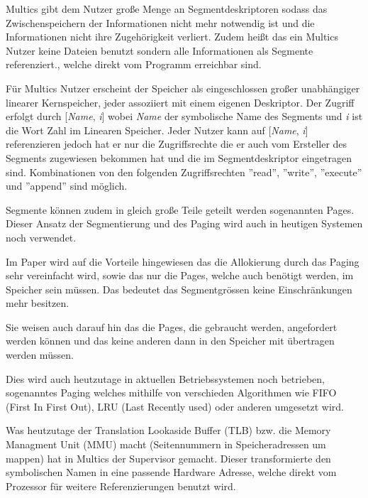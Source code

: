 \documentclass[11pt,technote]{IEEEtran}
\begin{document}
		    Multics gibt dem Nutzer gro\ss e Menge an Segmentdeskriptoren sodass das Zwischenspeichern der Informationen nicht mehr notwendig ist und 
		    die Informationen nicht ihre Zugeh\"origkeit verliert. Zudem hei\ss t das ein Multics Nutzer keine Dateien benutzt sondern alle Informationen
		    als Segmente referenziert., welche direkt vom Programm erreichbar sind.
		 
        F\"ur Multics Nutzer erscheint der Speicher als eingeschlossen gro\ss er unabh\"angiger linearer Kernspeicher,
        jeder assoziiert mit einem eigenen Deskriptor. 
        Der Zugriff erfolgt durch [\textit{Name}, \textit{i}] wobei \textit{Name} der symbolische Name des Segments und \textit{i} ist die Wort Zahl
        im Linearen Speicher. Jeder Nutzer kann auf [\textit{Name}, \textit{i}] referenzieren jedoch hat er nur die Zugriffsrechte die er auch vom Ersteller
	      des Segments zugewiesen bekommen hat und die im Segmentdeskriptor eingetragen sind.
	      Kombinationen von den folgenden Zugriffsrechten ''read'', ''write'', ''execute'' und ''append'' sind m\"oglich.
	 
	      Segmente k\"onnen zudem in gleich gro\ss e Teile geteilt werden sogenannten Pages. Dieser Ansatz der Segmentierung
	      und des Paging wird auch in heutigen Systemen noch verwendet.
	     
	      Im Paper \cite{inproc:multics} wird auf die Vorteile hingewiesen das die Allokierung durch das Paging sehr vereinfacht wird,
	      sowie das nur die Pages, welche auch ben\"otigt werden, im Speicher sein m\"ussen. 
	      Das bedeutet das Segmentgr\"ossen keine Einschr\"ankungen mehr besitzen.
	     
	      Sie weisen auch darauf hin das die Pages, die gebraucht werden, angefordert werden k\"onnen und das keine anderen dann in 
	      den Speicher mit \"ubertragen werden m\"ussen.
	     
	      Dies wird auch heutzutage in aktuellen Betriebssystemen noch betrieben, sogenanntes Paging welches mithilfe von
	      verschieden Algorithmen wie FIFO (First In First Out), LRU (Last Recently used) oder anderen umgesetzt wird.
	 
	      Was heutzutage der Translation Lookaside Buffer (TLB) bzw. die Memory Managment Unit (MMU) macht
	      (Seitennummern in Speicheradressen um mappen) hat in Multics der Supervisor gemacht.
	      Dieser transformierte den symbolischen Namen in eine passende Hardware Adresse, welche direkt vom Prozessor f\"ur weitere Referenzierungen benutzt wird.
	 
\end{document}
